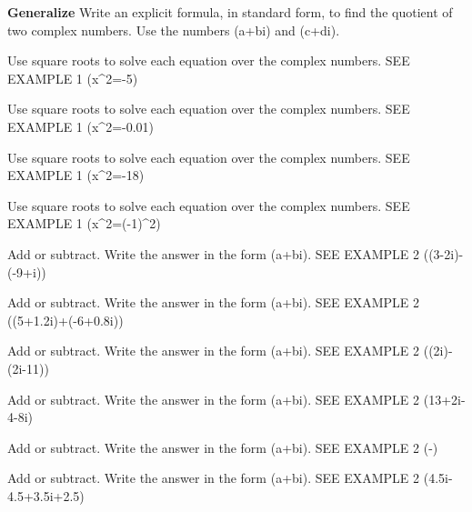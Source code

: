 \documentclass{article}
\newenvironment{practice}[2]{}{}        %
\newcommand{\answer}[1]{}               %
\newcommand{\te}[1]{}                   %
\begin{document}
\begin{practice}{13}{3}
\textbf{Generalize} Write an explicit formula, in standard form, to find the quotient of two complex numbers. Use the numbers (a+bi) and (c+di).
\answer{((a+bi)\div(c+di)=\frac{a+bi}{c+di})
(=\frac{a+bi}{c+di}(\frac{c-di}{c-di}))
(=\frac{ac-adi+cbi+bd}{c^2+d^2})
(=\frac{(ac+bd)+(cb-ad)i}{c^2+d^2})}
\end{practice}
\begin{practice}{14}{1}
Use square roots to solve each equation over the complex numbers. SEE EXAMPLE 1
(x^2=-5)
\answer{(\pm i\sqrt{5})}
\end{practice}
\begin{practice}{15}{1}
Use square roots to solve each equation over the complex numbers. SEE EXAMPLE 1
(x^2=-0.01)
\answer{(\pm0.1i)}
\end{practice}
\begin{practice}{16}{1}
Use square roots to solve each equation over the complex numbers. SEE EXAMPLE 1
(x^2=-18)
\answer{(\pm3i\sqrt{2})}
\end{practice}
\begin{practice}{17}{1}
Use square roots to solve each equation over the complex numbers. SEE EXAMPLE 1
(x^2=(-1)^2)
\answer{(1 or -1)}
\end{practice}
\begin{practice}{18}{1}
Add or subtract. Write the answer in the form (a+bi). SEE EXAMPLE 2
((3-2i)-(-9+i))
\answer{(12-3i)}
\end{practice}
\begin{practice}{19}{1}
Add or subtract. Write the answer in the form (a+bi). SEE EXAMPLE 2
((5+1.2i)+(-6+0.8i))
\answer{(-1+2i)}
\end{practice}
\begin{practice}{20}{1}
Add or subtract. Write the answer in the form (a+bi). SEE EXAMPLE 2
((2i)-(2i-11))
\answer{(11)}
\end{practice}
\begin{practice}{21}{1}
Add or subtract. Write the answer in the form (a+bi). SEE EXAMPLE 2
(13+2i-4-8i)
\answer{(9-6i)}
\end{practice}
\begin{practice}{22}{1}
Add or subtract. Write the answer in the form (a+bi). SEE EXAMPLE 2
(-)
\answer{(\frac{1}{12}+\frac{7}{12}i)}
\te{Printed answer has a plus before the imaginary term; the given subtraction yields (\frac{1}{12}-\frac{7}{12}i).}
\end{practice}
\begin{practice}{23}{1}
Add or subtract. Write the answer in the form (a+bi). SEE EXAMPLE 2
(4.5i-4.5+3.5i+2.5)
\answer{(-2+8i)}
\end{practice}
\end{document}
